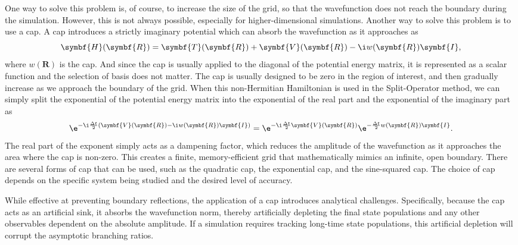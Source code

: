One way to solve this problem is, of course, to increase the size of the grid, so that the wavefunction does not reach the boundary during the simulation. However, this is not always possible, especially for higher-dimensional simulations. Another way to solve this problem is to use a \acrfull{cap}. A \acrshort{cap} introduces a strictly imaginary potential which can absorb the wavefunction as it approaches as
\begin{equation}
\symbf{H}(\symbf{R})=\symbf{T}(\symbf{R})+\symbf{V}(\symbf{R})-\i w(\symbf{R})\symbf{I},
\end{equation}
where $w(\symbf{R})$ is the \acrshort{cap}. And since the \acrshort{cap} is usually applied to the diagonal of the potential energy matrix, it is represented as a scalar function and the selection of basis does not matter. The \acrshort{cap} is usually designed to be zero in the region of interest, and then gradually increase as we approach the boundary of the grid. When this non-Hermitian Hamiltonian is used in the Split-Operator method, we can simply split the exponential of the potential energy matrix into the exponential of the real part and the exponential of the imaginary part as
\begin{equation}
\e^{-\i\frac{\Delta t}{2}(\symbf{V}(\symbf{R})-\i w(\symbf{R})\symbf{I})}=\e^{-\i\frac{\Delta t}{2}\symbf{V}(\symbf{R})}\e^{-\frac{\Delta t}{2}w(\symbf{R})\symbf{I}}.
\end{equation}
The real part of the exponent simply acts as a dampening factor, which reduces the amplitude of the wavefunction as it approaches the area where the \acrshort{cap} is non-zero. This creates a finite, memory-efficient grid that mathematically mimics an infinite, open boundary. There are several forms of \acrshort{cap} that can be used, such as the quadratic \acrshort{cap}, the exponential \acrshort{cap}, and the sine-squared \acrshort{cap}. The choice of \acrshort{cap} depends on the specific system being studied and the desired level of accuracy.

While effective at preventing boundary reflections, the application of a \acrshort{cap} introduces analytical challenges. Specifically, because the \acrshort{cap} acts as an artificial sink, it absorbs the wavefunction norm, thereby artificially depleting the final state populations and any other observables dependent on the absolute amplitude. If a simulation requires tracking long-time state populations, this artificial depletion will corrupt the asymptotic branching ratios.

